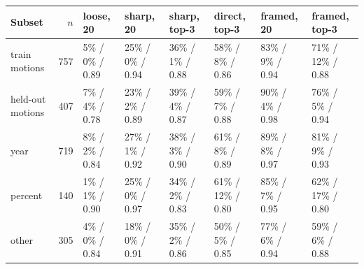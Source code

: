 \begin{tabular}{@{}lrllllll@{}}
\toprule
Subset & $n$ & loose, 20 & sharp, 20 & sharp, top-3 & direct, top-3 & framed, 20 & framed, top-3 \\
\midrule
train motions & 757 & 5\% / 0\% / 0.89 & 25\% / 0\% / 0.94 & 36\% / 1\% / 0.88 & 58\% / 8\% / 0.86 & 83\% / 9\% / 0.94 & 71\% / 12\% / 0.88 \\
held-out motions & 407 & 7\% / 4\% / 0.78 & 23\% / 2\% / 0.89 & 39\% / 4\% / 0.87 & 59\% / 7\% / 0.88 & 90\% / 4\% / 0.98 & 76\% / 5\% / 0.94 \\
year & 719 & 8\% / 2\% / 0.84 & 27\% / 1\% / 0.92 & 38\% / 3\% / 0.90 & 61\% / 8\% / 0.89 & 89\% / 8\% / 0.97 & 81\% / 9\% / 0.93 \\
percent & 140 & 1\% / 1\% / 0.90 & 25\% / 0\% / 0.97 & 34\% / 2\% / 0.83 & 61\% / 12\% / 0.80 & 85\% / 7\% / 0.95 & 62\% / 17\% / 0.80 \\
other & 305 & 4\% / 0\% / 0.84 & 18\% / 0\% / 0.91 & 35\% / 2\% / 0.86 & 50\% / 5\% / 0.85 & 77\% / 6\% / 0.94 & 59\% / 6\% / 0.88 \\
\bottomrule
\end{tabular}
